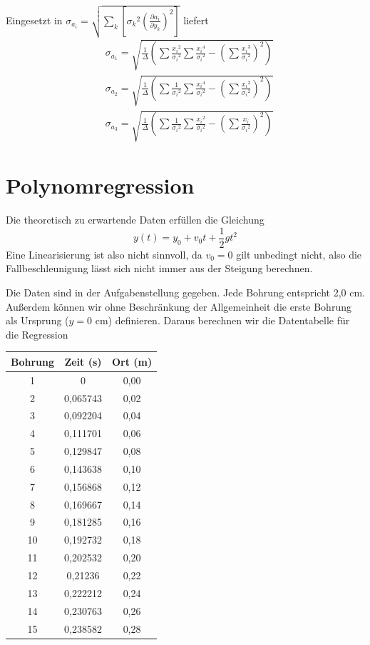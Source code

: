 \documentclass[prb,12pt]{revtex4-2}
\theoremstyle{definition}
\theoremstyle{definition}
\begin{document}
	Eingesetzt in ${\sigma_{a_i}}=\sqrt{\sum\limits_k\left[{\sigma_k}^2\left(\frac{\partial a_i}{\partial y_k}\right)^2\right]}$ liefert
	\begin{align*}
		&\sigma_{a_1}=\sqrt{\frac{1}{\Delta}\left(\sum \frac{{x_i}^2}{{\sigma_i}^2}\sum \frac{{x_i}^4}{{\sigma_i}^2}-\left(\sum \frac{{x_i}^3}{{\sigma_i}^2}\right)^2\right)}\\
		&\sigma_{a_2}=\sqrt{\frac{1}{\Delta}\left(\sum \frac{1}{{\sigma_i}^2}\sum \frac{{x_i}^4}{{\sigma_i}^2}-\left(\sum \frac{{x_i}^2}{{\sigma_i}^2}\right)^2\right)}\\
		&\sigma_{a_3}=\sqrt{\frac{1}{\Delta}\left(\sum \frac{1}{{\sigma_i}^2}\sum \frac{{x_i}^2}{{\sigma_i}^2}-\left(\sum \frac{{x_i}}{{\sigma_i}^2}\right)^2\right)}
	\end{align*}
\section{Polynomregression}
Die theoretisch zu erwartende Daten erfüllen die Gleichung
\[y(t)=y_0+v_0 t+\frac 12 gt^2\]
Eine Linearisierung ist also nicht sinnvoll, da $v_0=0$ gilt unbedingt nicht, also die Fallbeschleunigung lässt sich nicht immer aus der Steigung berechnen.

Die Daten sind in der Aufgabenstellung gegeben. Jede Bohrung entspricht 2,0 cm. Außerdem können wir ohne Beschränkung der Allgemeinheit die erste Bohrung als Ursprung ($y=0\text{ cm}$) definieren. Daraus berechnen wir die Datentabelle für die Regression

\begin{center}
	\begin{tabular}{ccc}
		\toprule
		\textbf{Bohrung} & \textbf{Zeit (s)} & \textbf{Ort (m)}\\\midrule
		1 & 0 & 0,00 \\\midrule
		2 & 0,065743 & 0,02 \\\midrule
		3 & 0,092204 & 0,04 \\\midrule
		4 & 0,111701 & 0,06 \\\midrule
		5 & 0,129847 & 0,08 \\\midrule
		6 & 0,143638 & 0,10 \\\midrule
		7 & 0,156868 & 0,12 \\\midrule
		8 & 0,169667 & 0,14 \\\midrule
		9 & 0,181285 & 0,16 \\\midrule
		10 & 0,192732 & 0,18 \\\midrule
		11 & 0,202532 & 0,20 \\\midrule
		12 & 0,21236 & 0,22 \\\midrule
		13 & 0,222212 & 0,24 \\\midrule
		14 & 0,230763 & 0,26 \\\midrule
		15 & 0,238582 & 0,28 \\\bottomrule
	\end{tabular}
\end{center}
\end{document}
